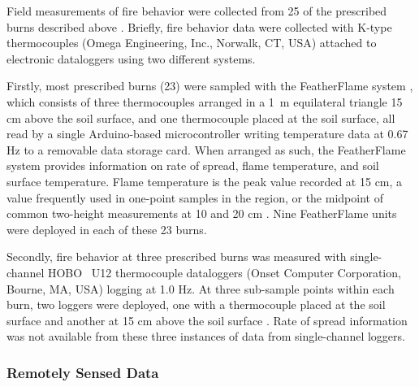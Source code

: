 \documentclass[fire,article,accept,oneauthor,pdftex]{Definitions/mdpi}
\begin{document}
Field measurements of fire behavior were collected from 25 of the prescribed burns described above \cite{mcgranahan2022,mcgranahan2023}.
Briefly, fire behavior data were collected with K-type thermocouples (Omega Engineering, Inc., Norwalk, CT, USA) attached to electronic dataloggers using two different systems.

Firstly, most prescribed burns (23) were sampled with the FeatherFlame system \cite{mcgranahan2021}, which consists of three thermocouples arranged in a 1~m equilateral triangle 15 cm above the soil surface, and one thermocouple placed at the soil surface, all read by a single Arduino-based microcontroller writing temperature data at 0.67 Hz to a removable data storage card.
When arranged as such, the FeatherFlame system provides information on rate of spread, flame temperature, and soil surface temperature. 
Flame temperature is the peak value recorded at 15 cm, a value frequently used in one-point samples in the region, or the midpoint of common two-height measurements at 10 and 20 cm \cite{mcgranahan2023}. 
Nine FeatherFlame units were deployed in each of these 23 burns.

Secondly, fire behavior at three prescribed burns was measured with single-channel HOBO\textregistered~ U12 thermocouple dataloggers (Onset Computer Corporation, Bourne, MA, USA) logging at 1.0 Hz. 
At three sub-sample points within each burn, two loggers were deployed, one with a thermocouple placed at the soil surface and another at 15 cm above the soil surface \cite{mcgranahan2022}. 
Rate of spread information was not available from these three instances of data from single-channel loggers. 

\subsubsection{Remotely Sensed Data}
\end{document}
